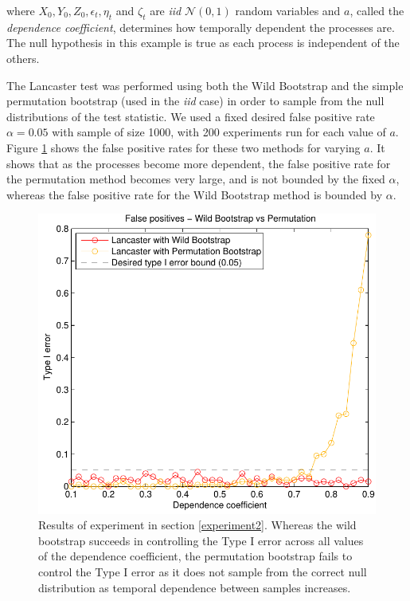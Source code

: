 \documentclass[]{article}
\begin{document}
where $X_0, Y_0, Z_0, \epsilon_t, \eta_t$ and $\zeta_t$ are \emph{iid} $\mathcal{N}(0,1)$ random variables and $a$, called the \emph{dependence coefficient}, determines how temporally dependent the processes are. The null hypothesis in this example is true as each process is independent of the others.

The Lancaster test was performed using both the Wild Bootstrap and the simple permutation bootstrap (used in the \emph{iid} case) in order to sample from the null distributions of the test statistic. We used a fixed desired false positive rate $\alpha = 0.05$ with sample of size 1000, with 200 experiments run for each value of $a$. Figure \ref{wildBootstrap_is_necessary} shows the false positive rates for these two methods for varying $a$. It shows that as the processes become more dependent, the false positive rate for the permutation method becomes very large, and is not bounded by the fixed $\alpha$, whereas the false positive rate for the Wild Bootstrap method is bounded by $\alpha$.
\begin{figure}[ht]
\vskip 0.2in
\begin{center}
\centerline{\includegraphics[scale=0.6]{UAI_Figure2.pdf}}
\caption{Results of experiment in section \ref{experiment2}. Whereas the wild bootstrap succeeds in controlling the Type I error across all values of the dependence coefficient, the permutation bootstrap fails to control the Type I error as it does not sample from the correct null distribution as temporal dependence between samples increases.}
\label{wildBootstrap_is_necessary}
\end{center}
\vskip -0.2in
\end{figure} 
\end{document}
